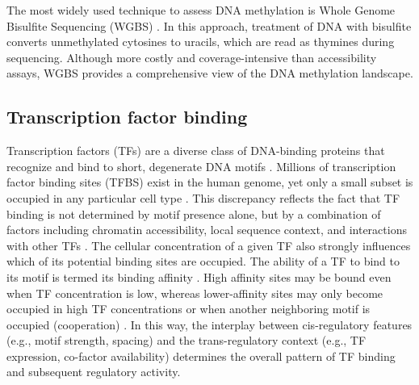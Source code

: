 \begin{dissertationintroduction}
The most widely used technique to assess DNA methylation is Whole Genome Bisulfite Sequencing (WGBS) \cite{Cokus2008-jt}. In this approach, treatment of DNA with bisulfite converts unmethylated cytosines to uracils, which are read as thymines during sequencing. Although more costly and coverage-intensive than accessibility assays, WGBS provides a comprehensive view of the DNA methylation landscape.

\subsection{Transcription factor binding}

Transcription factors (TFs) are a diverse class of DNA-binding proteins that recognize and bind to short, degenerate DNA motifs \cite{Isbel2022-fj,Stormo2000-ei,Badis2009-hv}. Millions of transcription factor binding sites (TFBS) exist in the human genome, yet only a small subset is occupied in any particular cell type \cite{Spitz2012-la}. This discrepancy reflects the fact that TF binding is not determined by motif presence alone, but by a combination of factors including chromatin accessibility, local sequence context, and interactions with other TFs \cite{Shlyueva2014-nr}. The cellular concentration of a given TF also strongly influences which of its potential binding sites are occupied. The ability of a TF to bind to its motif is termed its binding affinity \cite{Stormo2010-xm}. High affinity sites may be bound even when TF concentration is low, whereas lower-affinity sites may only become occupied in high TF concentrations or when another neighboring motif is occupied (cooperation) \cite{Reiter2017-ru}. In this way, the interplay between cis-regulatory features (e.g., motif strength, spacing) and the trans-regulatory context (e.g., TF expression, co-factor availability) determines the overall pattern of TF binding and subsequent regulatory activity.


\end{dissertationintroduction}
